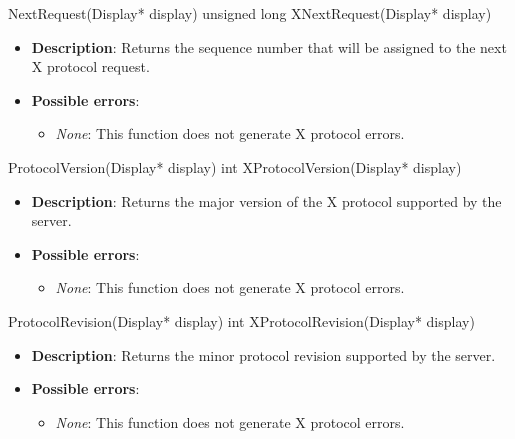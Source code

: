 \documentclass{report}
\begin{document}
\begin{itemize}
        \begin{cppcode}
            NextRequest(Display* display)
            unsigned long XNextRequest(Display* display)
        \end{cppcode}
        \begin{itemize}
            \item \textbf{Description}: Returns the sequence number that will be assigned to the next X protocol request.
            \item \textbf{Possible errors}:
                \begin{itemize}
                    \item \textit{None}: This function does not generate X protocol errors.
                \end{itemize}
        \end{itemize}

        \begin{cppcode}
            ProtocolVersion(Display* display)
            int XProtocolVersion(Display* display)
        \end{cppcode}
        \begin{itemize}
            \item \textbf{Description}: Returns the major version of the X protocol supported by the server.
            \item \textbf{Possible errors}:
                \begin{itemize}
                    \item \textit{None}: This function does not generate X protocol errors.
                \end{itemize}
        \end{itemize}

        \begin{cppcode}
            ProtocolRevision(Display* display)
            int XProtocolRevision(Display* display)
        \end{cppcode}
        \begin{itemize}
            \item \textbf{Description}: Returns the minor protocol revision supported by the server.
            \item \textbf{Possible errors}:
                \begin{itemize}
                    \item \textit{None}: This function does not generate X protocol errors.
                \end{itemize}
        \end{itemize}


\end{itemize}
\end{document}
